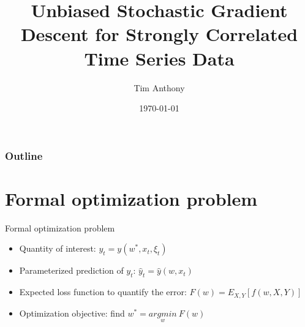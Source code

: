 \documentclass{beamer}
\title[Oral Qualification Examination]{Unbiased Stochastic Gradient Descent for Strongly Correlated Time Series Data} %
\author{Tim Anthony} %
\institute[IORA] %
{
Supervisor: Xin Tong\\
National University of Singapore \\ %


\medskip
}
\date{\today} %
\begin{document}
\begin{frame}
\titlepage %
\end{frame}






\begin{frame}
\frametitle{Outline} %
\tableofcontents %
\end{frame}


\section{Formal optimization problem}
\begin{frame}{Formal optimization problem}
    \begin{itemize}
        \item Quantity of interest: $y_t = y(w^*,x_t,\xi_t)$
        \item Parameterized prediction of $y_t$: $\hat{y}_t=\hat{y}(w,x_t)$
        \item 
        Expected loss function to quantify the error: $F(w) = E_{X,Y}[f(w,X,Y)]$
        \item Optimization objective: find $w^*=\underset{w}{argmin}\:F(w)$
        
    \end{itemize}


    
\end{frame}
\end{document}
